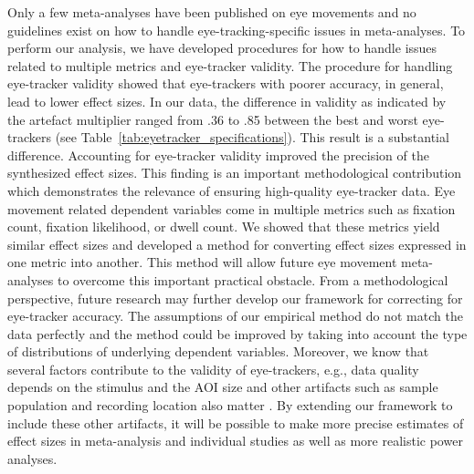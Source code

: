 Only a few meta-analyses have been published on eye movements and no guidelines exist on how to handle eye-tracking-specific issues in meta-analyses. To perform our analysis, we have developed procedures for how to handle issues related to multiple metrics and eye-tracker validity. The procedure for handling eye-tracker validity showed that eye-trackers with poorer accuracy, in general, lead to lower effect sizes. In our data, the difference in validity as indicated by the artefact multiplier ranged from .36 to .85 between the best and worst eye-trackers (see Table~\ref{tab:eyetracker_specifications}). This result is a substantial difference. Accounting for eye-tracker validity improved the precision of the synthesized effect sizes. This finding is an important methodological contribution which demonstrates the relevance of ensuring high-quality eye-tracker data. Eye movement related dependent variables come in multiple metrics such as fixation count, fixation likelihood, or dwell count. We showed that these metrics yield similar effect sizes and developed a method for converting effect sizes expressed in one metric into another. This method will allow future eye movement meta-analyses to overcome this important practical obstacle. From a methodological perspective, future research may further develop our framework for correcting for eye-tracker accuracy. The assumptions of our empirical method do not match the data perfectly and the method could be improved by taking into account the type of distributions of underlying dependent variables. Moreover, we know that several factors contribute to the validity of eye-trackers, e.g., data quality depends on the stimulus and the AOI size \citep{orquin2018a} and other artifacts such as sample population and recording location also matter \citep{nystroem2013a}. By extending our framework to include these other artifacts, it will be possible to make more precise estimates of effect sizes in meta-analysis and individual studies as well as more realistic power analyses.\\   


